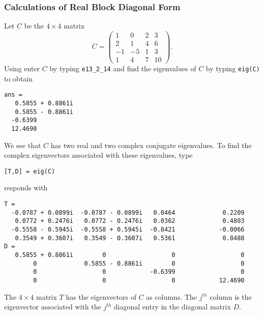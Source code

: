 \documentclass{ximera}
\begin{document}
\subsubsection*{\Matlab Calculations of Real Block Diagonal Form}

Let $C$ be the $4\times 4$ matrix
\begin{equation*}
C =\left(\begin{array}{rrrr}  1 & 0 & 2 & 3 \\ 2 & 1 & 4 & 6\\
-1 & -5 & 1 & 3 \\ 1 & 4 & 7 & 10 \end{array}\right).
\end{equation*}
Using \Matlab enter $C$ by typing {\tt e13\_2\_14} and find the 
eigenvalues of $C$ by typing {\tt eig(C)} 
to obtain
\begin{verbatim}
ans =
   0.5855 + 0.8861i
   0.5855 - 0.8861i
  -0.6399          
  12.4690    
\end{verbatim}
We see that $C$ has two real and two complex conjugate eigenvalues.
To find the complex eigenvectors associated with these eigenvalues,
type 
\begin{verbatim}
[T,D] = eig(C)
\end{verbatim}
\Matlab responds with
\begin{verbatim}
T =
  -0.0787 + 0.0899i  -0.0787 - 0.0899i   0.0464             0.2209          
   0.0772 + 0.2476i   0.0772 - 0.2476i   0.0362             0.4803          
  -0.5558 - 0.5945i  -0.5558 + 0.5945i  -0.8421            -0.0066          
   0.3549 + 0.3607i   0.3549 - 0.3607i   0.5361             0.8488          
D =
   0.5855 + 0.8861i        0                  0                  0          
        0             0.5855 - 0.8861i        0                  0          
        0                  0            -0.6399                  0          
        0                  0                  0            12.4690          
\end{verbatim}
The $4\times 4$ matrix $T$ has the eigenvectors of $C$ as columns.
The $j^{th}$ column is the eigenvector associated with the $j^{th}$
diagonal entry in the diagonal matrix $D$. 
\end{document}

